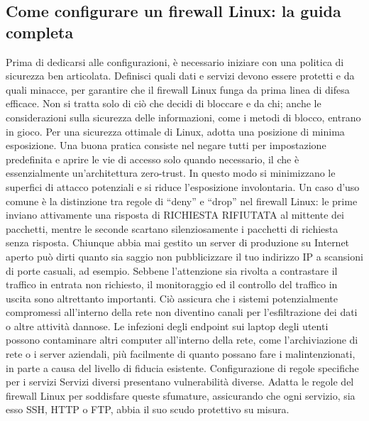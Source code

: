 \subsection{Come configurare un firewall Linux: la guida completa} 
Prima di dedicarsi alle configurazioni, è necessario iniziare con una politica di sicurezza ben articolata. 
Definisci quali dati e servizi devono essere protetti e da quali minacce, 
per garantire che il firewall Linux funga da prima linea di difesa efficace. 
Non si tratta solo di ciò che decidi di bloccare e da chi; 
anche le considerazioni sulla sicurezza delle informazioni, come i metodi di blocco, entrano in gioco. 
\vspace{2ex} \newline  
Per una sicurezza ottimale di Linux, adotta una posizione di minima esposizione. 
Una buona pratica consiste nel negare tutti per impostazione predefinita e aprire 
le vie di accesso solo quando necessario, il che è essenzialmente un’architettura zero-trust. 
In questo modo si minimizzano le superfici di attacco potenziali e si riduce l’esposizione involontaria. 
Un caso d’uso comune è la distinzione tra regole di “deny” e “drop” nel firewall Linux: 
le prime inviano attivamente una risposta di RICHIESTA RIFIUTATA al mittente dei pacchetti, 
mentre le seconde scartano silenziosamente i pacchetti di richiesta senza risposta. 
Chiunque abbia mai gestito un server di produzione su Internet aperto può dirti quanto 
sia saggio non pubblicizzare il tuo indirizzo IP a scansioni di porte casuali, ad esempio.
\vspace{2ex} \newline 
Sebbene l’attenzione sia rivolta a contrastare il traffico in entrata non richiesto, 
il monitoraggio ed il controllo del traffico in uscita sono altrettanto importanti. 
Ciò assicura che i sistemi potenzialmente compromessi all’interno della rete non diventino canali 
per l’esfiltrazione dei dati o altre attività dannose. 
Le infezioni degli endpoint sui laptop degli utenti possono contaminare altri computer all’interno della rete, 
come l’archiviazione di rete o i server aziendali, più facilmente di quanto possano fare i malintenzionati, 
in parte a causa del livello di fiducia esistente. 
\vspace{2ex} \newline  
Configurazione di regole specifiche per i servizi
Servizi diversi presentano vulnerabilità diverse.
Adatta le regole del firewall Linux per soddisfare queste sfumature, assicurando che ogni servizio, 
sia esso SSH, HTTP o FTP, abbia il suo scudo protettivo su misura. 
